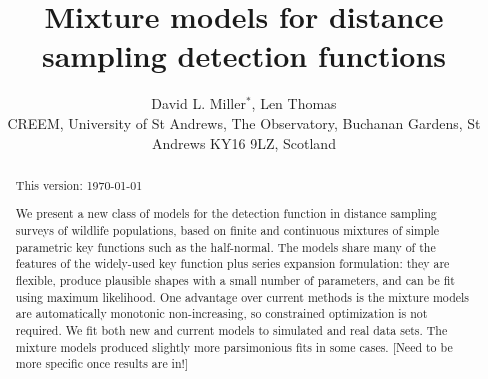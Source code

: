 \documentclass[useAMS,referee, usegraphicx]{biom}
\title[Mixture model detection functions]{Mixture models for distance sampling detection functions}
\author{David L. Miller$^{*}$\email{dave@ninepointeightone.net}, 
Len Thomas\\
CREEM, University of St Andrews, The Observatory, Buchanan Gardens, St Andrews KY16 9LZ, Scotland}
\begin{document}








\label{firstpage}


\begin{abstract}
This version: \today %


We present a new class of models for the detection function in distance sampling surveys of wildlife populations, based on finite and continuous mixtures of simple parametric key functions such as the half-normal.  The models share many of the features of the widely-used key function plus series expansion formulation: they are flexible, produce plausible shapes with a small number of parameters, and can be fit using maximum likelihood.  One advantage over current methods is the mixture models are automatically monotonic non-increasing, so constrained optimization is not required.  We fit both new and current models to simulated and real data sets.  The mixture models produced slightly more parsimonious fits in some cases. [Need to be more specific once results are in!]
\end{abstract}
\end{document}
